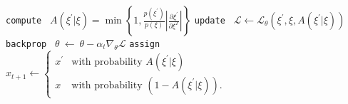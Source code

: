 \documentclass{article} %
\begin{document}
\begin{algorithm}[htpb]
{{         %
      }
      \texttt{compute } \(A(\xi^{\prime}|\xi) =%
      \min\left\{1,\frac{p(\xi^{\prime})}{p(\xi)}\left|\frac{\partial%
      \xi^{\prime}}{\partial \xi^{T}}\right|\right\}\)\;
      \texttt{update } \(\mathcal{L}\leftarrow \mathcal{L}_{\theta}(\xi^{\prime},\xi,%
      A(\xi^{\prime}|\xi))\)\;
      \texttt{backprop } \(\theta\ \leftarrow\ \theta-\alpha_t \nabla_{\theta} \mathcal{L}\)\;
      \texttt{assign } \(x_{t+1} \leftarrow
      \begin{cases}
         x^{\prime} &\mbox{with probability } A(\xi^{\prime}|\xi) \\
         x &\mbox{with probability } (1 - A(\xi^{\prime}|\xi)).%
      \end{cases}%
      \)\;
   }\;
\end{algorithm}%
%
%
\end{document}
